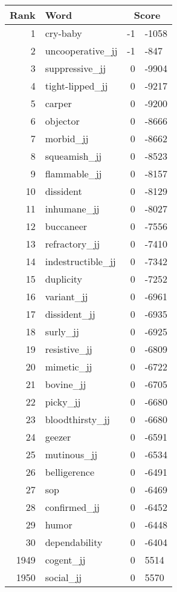 \begin{longtable}[!htbp]{| rlr@{.}l |}
    \hline
    \textbf{Rank} & \textbf{Word} & \multicolumn{2}{c|}{\textbf{Score}} \\
    \hline
    \endhead
    1 & cry-baby & -1 & -1058 \\
    2 & uncooperative\_jj & -1 & -847 \\
    3 & suppressive\_jj & 0 & -9904 \\
    4 & tight-lipped\_jj & 0 & -9217 \\
    5 & carper & 0 & -9200 \\
    6 & objector & 0 & -8666 \\
    7 & morbid\_jj & 0 & -8662 \\
    8 & squeamish\_jj & 0 & -8523 \\
    9 & flammable\_jj & 0 & -8157 \\
    10 & dissident & 0 & -8129 \\
    11 & inhumane\_jj & 0 & -8027 \\
    12 & buccaneer & 0 & -7556 \\
    13 & refractory\_jj & 0 & -7410 \\
    14 & indestructible\_jj & 0 & -7342 \\
    15 & duplicity & 0 & -7252 \\
    16 & variant\_jj & 0 & -6961 \\
    17 & dissident\_jj & 0 & -6935 \\
    18 & surly\_jj & 0 & -6925 \\
    19 & resistive\_jj & 0 & -6809 \\
    20 & mimetic\_jj & 0 & -6722 \\
    21 & bovine\_jj & 0 & -6705 \\
    22 & picky\_jj & 0 & -6680 \\
    23 & bloodthirsty\_jj & 0 & -6680 \\
    24 & geezer & 0 & -6591 \\
    25 & mutinous\_jj & 0 & -6534 \\
    26 & belligerence & 0 & -6491 \\
    27 & sop & 0 & -6469 \\
    28 & confirmed\_jj & 0 & -6452 \\
    29 & humor & 0 & -6448 \\
    30 & dependability & 0 & -6404 \\
    1949 & cogent\_jj & 0 & 5514 \\
    1950 & social\_jj & 0 & 5570 \\

\end{longtable}
